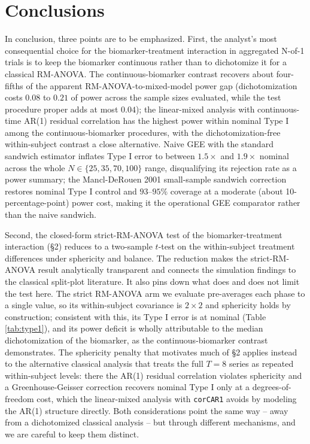 \documentclass[
  11pt,
]{article}
\begin{document}
\section{Conclusions}\label{conclusions}

In conclusion, three points are to be emphasized. First, the
analyst's most consequential choice for the biomarker-treatment
interaction in aggregated N-of-1 trials is to keep the biomarker
continuous rather than to dichotomize it for a classical
RM-ANOVA. The continuous-biomarker contrast recovers about
four-fifths of the apparent RM-ANOVA-to-mixed-model power gap
(dichotomization costs \(0.08\) to \(0.21\) of power across the
sample sizes evaluated, while the test procedure proper adds at
most \(0.04\)); the linear-mixed analysis with continuous-time
AR(1) residual correlation has the highest power within nominal
Type I among the continuous-biomarker procedures, with the
dichotomization-free within-subject contrast a close alternative.
Naive GEE with the standard sandwich estimator inflates Type I
error to between \(1.5\times\) and \(1.9\times\) nominal across the
whole \(N \in \{25,35,70,100\}\) range, disqualifying its rejection
rate as a power summary; the Mancl-DeRouen 2001 small-sample
sandwich correction restores nominal Type I control and
\(93\)--\(95\%\) coverage at a moderate (about 10-percentage-point)
power cost, making it the operational GEE comparator rather than
the naive sandwich.

Second, the closed-form strict-RM-ANOVA test of the
biomarker-treatment interaction (\S2) reduces to a two-sample
\(t\)-test on the within-subject treatment differences under
sphericity and balance. The reduction makes the strict-RM-ANOVA
result analytically transparent and connects the simulation
findings to the classical split-plot literature. It also pins
down what does and does not limit the test here. The strict
RM-ANOVA arm we evaluate pre-averages each phase to a single
value, so its within-subject covariance is \(2 \times 2\) and
sphericity holds by construction; consistent with this, its Type
I error is at nominal (Table \ref{tab:type1}), and its power
deficit is wholly attributable to the median dichotomization of
the biomarker, as the continuous-biomarker contrast demonstrates.
The sphericity penalty that motivates much of \S2 applies instead
to the alternative classical analysis that treats the full
\(T = 8\) series as repeated within-subject levels: there the AR(1)
residual correlation violates sphericity and a
Greenhouse-Geisser correction recovers nominal Type I only at a
degrees-of-freedom cost, which the linear-mixed analysis with
\texttt{corCAR1} avoids by modeling the AR(1) structure directly. Both
considerations point the same way -- away from a dichotomized
classical analysis -- but through different mechanisms, and we
are careful to keep them distinct.
\end{document}
